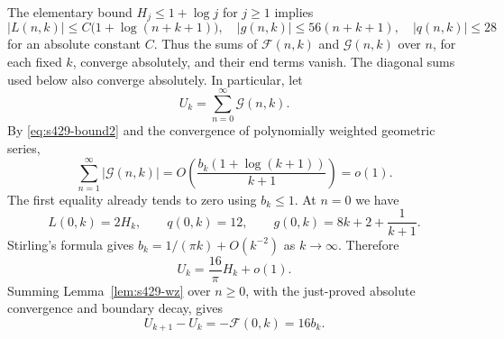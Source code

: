 \documentclass[11pt,a4paper]{article}
\theoremstyle{remark}\newtheorem{remark}[theorem]{Remark}
\numberwithin{equation}{section}
\begin{document}
The elementary bound $H_j\le1+\log j$ for $j\ge1$ implies
\[
 |L(n,k)|\le C\bigl(1+\log(n+k+1)\bigr),\quad
 |g(n,k)|\le56(n+k+1),\quad |q(n,k)|\le28
\]
for an absolute constant $C$. Thus the sums of $\mathcal F(n,k)$ and $\mathcal G(n,k)$ over $n$,
for each fixed $k$, converge absolutely, and their end terms vanish.
The diagonal sums used below also converge absolutely.
In particular, let
\[
 U_k=\sum_{n=0}^{\infty}\mathcal G(n,k).
\]
By \eqref{eq:s429-bound2} and the convergence of polynomially weighted
geometric series,
\begin{equation}\label{eq:s429-rem}
 \sum_{n=1}^{\infty}|\mathcal G(n,k)|
 =O\!\left(\frac{b_k(1+\log(k+1))}{k+1}\right)=o(1).
\end{equation}
The first equality already tends to zero using $b_k\le1$.
At $n=0$ we have
\[
 L(0,k)=2H_k,\qquad q(0,k)=12,\qquad
 g(0,k)=8k+2+\frac1{k+1}.
\]
Stirling's formula gives $b_k=1/(\pi k)+O(k^{-2})$ as $k\to\infty$.
Therefore
\begin{equation}\label{eq:s429-Uk}
 U_k=\frac{16}{\pi}H_k+o(1).
\end{equation}
Summing Lemma~\ref{lem:s429-wz} over $n\ge0$, with the just-proved
absolute convergence and boundary decay, gives
\begin{equation}\label{eq:s429-rec}
 U_{k+1}-U_k=-\mathcal F(0,k)=16b_k.
\end{equation}
\end{document}
